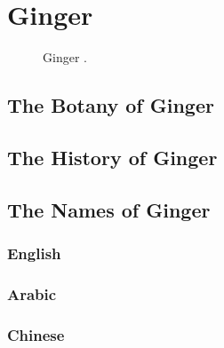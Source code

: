 \section{Ginger}
\label{sec:ginger}



\begin{figure}[!ht]
	\vspace{-4ex}
	\centering
	\hfill
	\caption{Ginger \taxon{}.}
	\label{fig:ginger_imgs}
\end{figure}

\subsection{The Botany of Ginger}

\subsection{The History of Ginger}

\subsection{The Names of Ginger}

\subsubsection{English}





\subsubsection{Arabic}





\subsubsection{Chinese}



